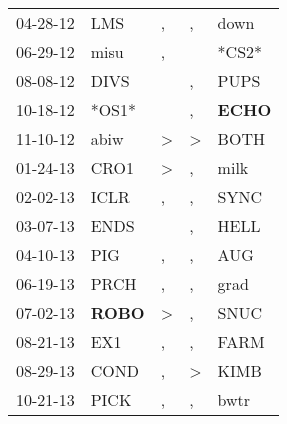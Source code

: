 \begin{supertabular}{p{0.07\textwidth}p{0.06\textwidth}p{0.02\textwidth}p{0.02\textwidth}p{0.06\textwidth}}
          04-28-12\textsuperscript{} &            LMS\textsuperscript{} &                , &                , &           down\textsuperscript{} \\
          06-29-12\textsuperscript{} &           misu\textsuperscript{} &                , &                  &                            *CS2* \\
          08-08-12\textsuperscript{} &           DIVS\textsuperscript{} &                  &                , &           PUPS\textsuperscript{} \\
          10-18-12\textsuperscript{} &                            *OS1* &                  &                , &  \textbf{ECHO\textsuperscript{}} \\
          11-10-12\textsuperscript{} &           abiw\textsuperscript{} &     \textgreater &     \textgreater &           BOTH\textsuperscript{} \\
          01-24-13\textsuperscript{} &           CRO1\textsuperscript{} &     \textgreater &                , &           milk\textsuperscript{} \\
          02-02-13\textsuperscript{} &           ICLR\textsuperscript{} &                , &                , &           SYNC\textsuperscript{} \\
          03-07-13\textsuperscript{} &           ENDS\textsuperscript{} &                  &                , &           HELL\textsuperscript{} \\
          04-10-13\textsuperscript{} &            PIG\textsuperscript{} &                , &                , &            AUG\textsuperscript{} \\
          06-19-13\textsuperscript{} &           PRCH\textsuperscript{} &                , &                , &           grad\textsuperscript{} \\
          07-02-13\textsuperscript{} &  \textbf{ROBO\textsuperscript{}} &     \textgreater &                , &           SNUC\textsuperscript{} \\
          08-21-13\textsuperscript{} &            EX1\textsuperscript{} &                , &                , &           FARM\textsuperscript{} \\
          08-29-13\textsuperscript{} &           COND\textsuperscript{} &                , &     \textgreater &           KIMB\textsuperscript{} \\
          10-21-13\textsuperscript{} &           PICK\textsuperscript{} &                , &                , &           bwtr\textsuperscript{} \\

\end{supertabular}
